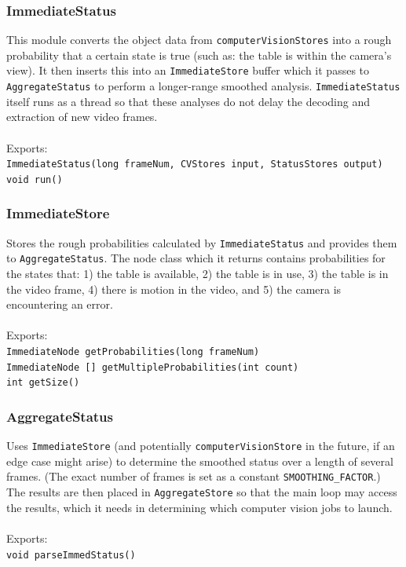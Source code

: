 \documentclass[11pt]{report}
\begin{document}
\subsubsection{ImmediateStatus}

This module converts the object data from \texttt{computerVisionStores} into a rough probability that a certain state is true (such as: the table is within the camera's view).  It then inserts this into an \texttt{ImmediateStore} buffer which it passes to \texttt{AggregateStatus} to perform a longer-range smoothed analysis.  \texttt{ImmediateStatus} itself runs as a thread so that these analyses do not delay the decoding and extraction of new video frames.\\
\\
Exports:\\
\texttt{ImmediateStatus(long frameNum, CVStores input, StatusStores output)\\
void run()}

\subsubsection{ImmediateStore}

Stores the rough probabilities calculated by \texttt{ImmediateStatus} and provides them to \texttt{AggregateStatus}.  The node class which it returns contains probabilities for the states that: 1) the table is available, 2) the table is in use, 3) the table is in the video frame, 4) there is motion in the video, and 5) the camera is encountering an error.\\
\\
Exports:\\
\texttt{ImmediateNode getProbabilities(long frameNum)}\\
\texttt{ImmediateNode [] getMultipleProbabilities(int count)}\\
\texttt{int getSize()}


\subsubsection{AggregateStatus}

Uses \texttt{ImmediateStore} (and potentially \texttt{computerVisionStore} in the future, if an edge case might arise) to determine the smoothed status over a length of several frames.  (The exact number of frames is set as a constant \texttt{SMOOTHING\_FACTOR}.)  The results are then placed in \texttt{AggregateStore} so that the main loop may access the results, which it needs in determining which computer vision jobs to launch.\\
\\
Exports:\\
\texttt{void parseImmedStatus()}
\end{document}
